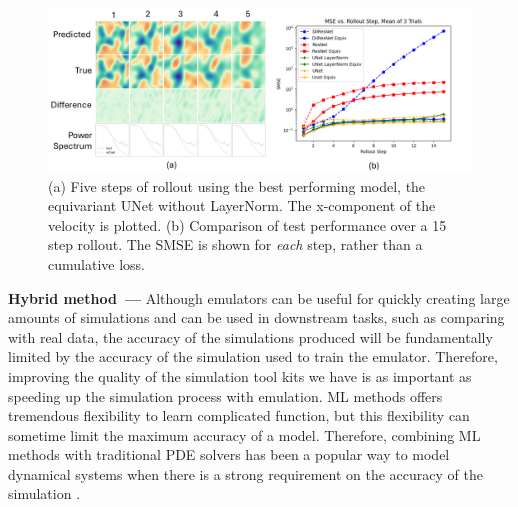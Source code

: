 \documentclass[11pt]{article}
\renewcommand{\paragraph}[1]{\medskip\par\noindent\textbf{#1~---}}
\begin{document}
\begin{figure}
    \includegraphics[width=\textwidth]{figures/cfd_results.pdf}
    \caption{(a) Five steps of rollout using the best performing model, the equivariant UNet without LayerNorm. 
    The x-component of the velocity is plotted.
    (b) Comparison of test performance over a 15 step rollout.
    The SMSE is shown for \textit{each} step, rather than a cumulative loss.}
    \label{fig:cfd_results}
\end{figure}


\paragraph{Hybrid method}
Although emulators can be useful for quickly creating large amounts of simulations and can be used in downstream tasks, such as comparing with real data, the accuracy of the simulations produced will be fundamentally limited by the accuracy of the simulation used to train the emulator. Therefore, improving the quality of the simulation tool kits we have is as important as speeding up the simulation process with emulation. ML methods offers tremendous flexibility to learn complicated function, but this flexibility can sometime limit the maximum accuracy of a model. Therefore, combining ML methods with traditional PDE solvers has been a popular way to model dynamical systems when there is a strong requirement on the accuracy of the simulation \cite{Kidger2022OnND, Rackauckas2020UniversalDE}.
\end{document}
